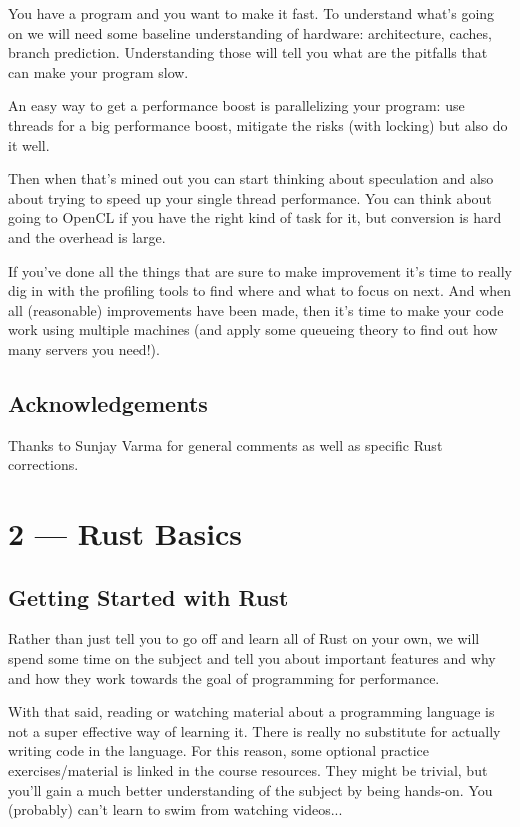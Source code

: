 \documentclass[a4paper]{report}
\begin{document}
You have a program and you want to make it fast. To understand what's going on we will need some baseline understanding of hardware: architecture, caches, branch prediction. Understanding those will tell you what are the pitfalls that can make your program slow.

An easy way to get a performance boost is parallelizing your program: use threads for a big performance boost, mitigate the risks (with locking) but also do it well. 

Then when that's mined out you can start thinking about speculation and also about trying to speed up your single thread performance. You can think about going to OpenCL if you have the right kind of task for it, but conversion is hard and the overhead is large. 

If you've done all the things that are sure to make improvement it's time to really dig in with the profiling tools to find where and what to focus on next. And when all (reasonable) improvements have been made, then it's time to make your code work using multiple machines (and apply some queueing theory to find out how many servers you need!).

\section*{Acknowledgements} Thanks to Sunjay Varma for general comments as well as specific Rust corrections.









\chapter*{2 --- Rust Basics}


\section*{Getting Started with Rust}
Rather than just tell you to go off and learn all of Rust on your own, we will spend some time on the subject and tell you about important features and why and how they work towards the goal of programming for performance.

With that said, reading or watching material about a programming language is not a super effective way of learning it. There is really no substitute for actually writing code in the language. For this reason, some optional practice exercises/material is linked in the course resources. They might be trivial, but you'll gain a much better understanding of the subject by being hands-on. You (probably) can't learn to swim from watching videos...
\end{document}

